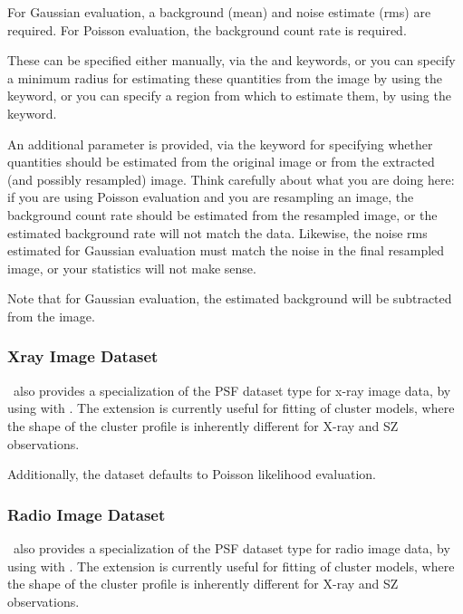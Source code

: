 For Gaussian evaluation, a background (mean) and noise estimate (rms)
are required.  For Poisson evaluation, the background count rate is
required.

These can be specified either manually, via the  and
 keywords, or you can specify a minimum radius for
estimating these quantities from the image by using the
 keyword, or you can specify a region from which to
estimate them, by using the  keyword.  

An additional parameter is provided, via the  keyword
for specifying whether quantities should be estimated from the
original image or from the extracted (and possibly resampled) image.
Think carefully about what you are doing here: if you are using
Poisson evaluation and you are resampling an image, the background
count rate should be estimated from the resampled image, or the
estimated background rate will not match the data.  Likewise, the
noise rms estimated for Gaussian evaluation must match the noise in
the final resampled image, or your statistics will not make sense.

Note that for Gaussian evaluation, the estimated background will be
subtracted from the image.

\subsubsection{Xray Image Dataset}

\climax\ also provides a specialization of the PSF dataset type for
x-ray image data, by using  with .
The extension is currently useful for fitting of cluster models, where
the shape of the cluster profile is inherently different for X-ray and
SZ observations.

Additionally, the  dataset defaults to Poisson
likelihood evaluation.

\subsubsection{Radio Image Dataset}

\climax\ also provides a specialization of the PSF dataset type for
radio image data, by using  with .
The extension is currently useful for fitting of cluster models, where
the shape of the cluster profile is inherently different for X-ray and
SZ observations.
